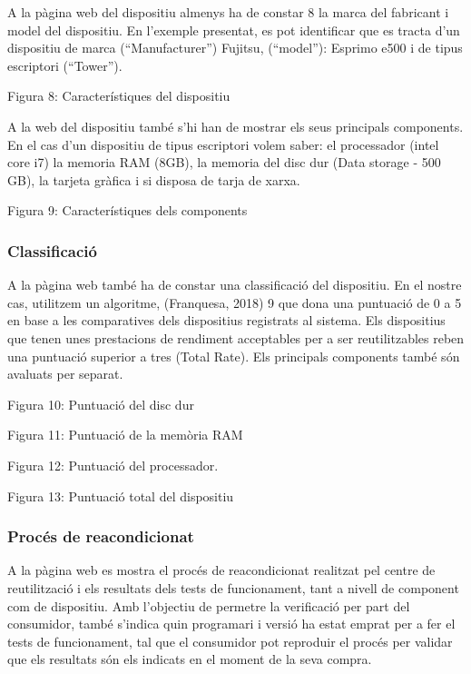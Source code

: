 \documentclass[
]{book}
\begin{document}
A la pàgina web del dispositiu almenys ha de constar 8 la marca del fabricant i model del
dispositiu. En l'exemple presentat, es pot identificar que es tracta d'un dispositiu de marca
(``Manufacturer'') Fujitsu, (``model''): Esprimo e500 i de tipus escriptori (``Tower'').

Figura 8: Característiques del dispositiu

A la web del dispositiu també s'hi han de mostrar els seus principals components. En el cas
d'un dispositiu de tipus escriptori volem saber: el processador (intel core i7) la memoria RAM
(8GB), la memoria del disc dur (Data storage - 500 GB), la tarjeta gràfica i si disposa de tarja de
xarxa.

Figura 9: Característiques dels components

\hypertarget{classificaciuxf3}{%
\subsubsection{Classificació}\label{classificaciuxf3}}

A la pàgina web també ha de constar una classificació del dispositiu. En el nostre cas, utilitzem un algoritme, (Franquesa, 2018) 9 que dona una puntuació de 0 a 5 en base a les comparatives dels dispositius registrats al sistema. Els dispositius que tenen unes prestacions de rendiment acceptables per a ser reutilitzables reben una puntuació superior a tres (Total Rate). Els principals components també són avaluats per separat.

Figura 10: Puntuació del disc dur

Figura 11: Puntuació de la memòria RAM

Figura 12: Puntuació del processador.

Figura 13: Puntuació total del dispositiu

\hypertarget{procuxe9s-de-reacondicionat}{%
\subsubsection{Procés de reacondicionat}\label{procuxe9s-de-reacondicionat}}

A la pàgina web es mostra el procés de reacondicionat realitzat pel centre de reutilització i els resultats dels tests de funcionament, tant a nivell de component com de dispositiu. Amb l'objectiu de permetre la verificació per part del consumidor, també s'indica quin programari i versió ha estat emprat per a fer el tests de funcionament, tal que el consumidor pot reproduir el procés per validar que els resultats són els indicats en el moment de la seva compra.
\end{document}

